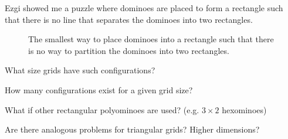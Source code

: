 \documentclass{article}
\begin{document}
Ezgi showed me a puzzle where dominoes are placed to form a rectangle such that
there is no line that separates the dominoes into two rectangles.
\begin{figure}[ht!]
  \centering
  \caption{
    The smallest way to place dominoes into a rectangle such that there is no
    way to partition the dominoes into two rectangles.
  }
\end{figure}
\begin{question}
  What size grids have such configurations?
\end{question}

\begin{related}
  \item How many configurations exist for a given grid size?
  \item What if other rectangular polyominoes are used? (e.g. $3 \times 2$ hexominoes)
  \item Are there analogous problems for triangular grids? Higher dimensions?
\end{related}
\end{document}
